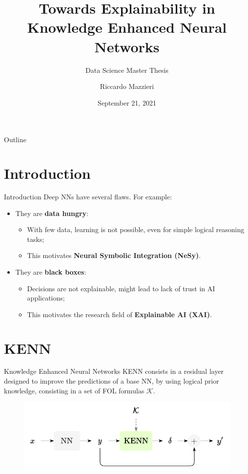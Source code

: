 \documentclass{beamer}
\title{Towards Explainability in Knowledge Enhanced Neural Networks}
\subtitle{Data Science Master Thesis}
\author{Riccardo Mazzieri}
\date{September 21, 2021}
\begin{document}
	\maketitle

	\begin{frame}{Outline}
		\tableofcontents
	\end{frame}


	\section{Introduction}

	\begin{frame}{Introduction}
		Deep NNs have several flaws. For example:
		\begin{itemize}
			\item They are \textbf{data hungry}:
			\begin{itemize}
				\item With few data, learning is not possible, even for simple logical reasoning tasks;
				\item This motivates \textbf{Neural Symbolic Integration (NeSy)}.
			\end{itemize}
			\item They are \textbf{black boxes}:
			\begin{itemize}
				\item Decisions are not explainable, might lead to lack of trust in AI applications;
				\item This motivates the research field of \textbf{Explainable AI (XAI)}.
			\end{itemize}
		\end{itemize}
	\end{frame}


	\section{KENN}

	\begin{frame}{Knowledge Enhanced Neural Networks}
		KENN consists in a residual layer designed to improve the predictions of a base NN, by using logical prior knowledge, consisting in a set of FOL formulas $\mathcal{K}$.
		\begin{figure}
			\centering
			\includegraphics[width=0.95\linewidth]{images/kenn_intuition.pdf}
			
		\end{figure}
	\end{frame}
\end{document}
